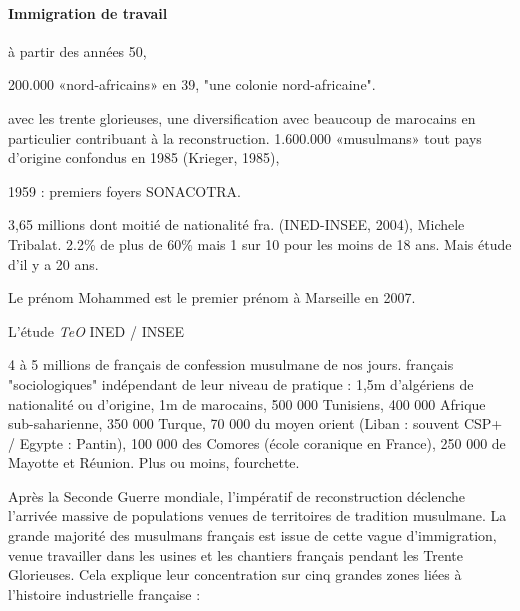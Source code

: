 \paragraph{Immigration de travail}
à partir des années 50, 
\bi
\item 200.000 «nord-africains» en 39, "une colonie nord-africaine". 
\item avec les trente glorieuses, une diversification avec beaucoup de marocains en particulier contribuant à la reconstruction. 1.600.000 «musulmans» tout pays d’origine confondus en 1985 (Krieger, 1985),
\item 1959 : premiers foyers SONACOTRA. 
\item 3,65 millions dont moitié de nationalité fra. (INED-INSEE, 2004), Michele Tribalat.  2.2\% de plus de 60\% mais 1 sur 10 pour les moins de 18 ans. Mais étude d'il y a 20 ans. 
\item Le prénom Mohammed est le premier prénom à Marseille en 2007.
\item L'étude \emph{TeO} INED / INSEE 
\item 4 à 5 millions de français de confession musulmane de nos jours. français "sociologiques" indépendant de leur niveau de pratique : 1,5m d'algériens de nationalité ou d'origine, 1m de marocains, 500 000 Tunisiens, 400 000 Afrique sub-saharienne, 350 000 Turque, 70 000 du moyen orient (Liban : souvent CSP+ / Egypte : Pantin), 100 000 des Comores (école coranique en France), 250 000 de Mayotte et Réunion. Plus ou moins, fourchette. 
\ei



Après la Seconde Guerre mondiale, l'impératif de reconstruction
déclenche l'arrivée massive de populations venues de territoires de
tradition musulmane. La grande majorité des musulmans français est issue
de cette vague d'immigration, venue travailler dans les usines et les
chantiers français pendant les Trente Glorieuses. Cela explique leur
concentration sur cinq grandes zones liées à l'histoire industrielle
française :


